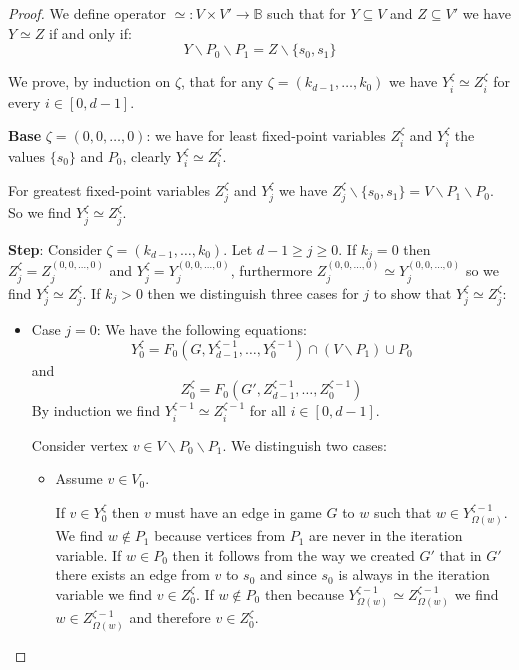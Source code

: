 \begin{theorem}
\begin{proof}
		
		We define operator $\simeq : V \times V' \rightarrow \mathbb{B}$ such that for $Y \subseteq V$ and $Z \subseteq V'$ we have $Y \simeq Z$ if and only if:
		\[ Y \backslash P_0 \backslash P_1 = Z \backslash \{s_0,s_1\}\]
		
		We prove, by induction on $\zeta$, that for any $\zeta = (k_{d-1},\dots,k_0)$ we have $Y_i^{\zeta} \simeq Z_i^{\zeta}$ for every $i \in [0,d-1]$.
	
		
		\textbf{Base} $\zeta = (0,0,\dots,0)$: we have for least fixed-point variables $Z_i^\zeta$ and $Y_i^{\zeta}$ the values $\{s_0\}$ and $P_0$, clearly $Y_i^\zeta \simeq Z_i^{\zeta}$. 
		
		For greatest fixed-point variables $Z_j^\zeta$ and $Y_j^{\zeta}$ we have $Z_j^\zeta \backslash \{s_0,s_1\} = V \backslash P_1 \backslash P_0$. So we find $Y_j^\zeta \simeq Z_j^{\zeta}$.
		
		\textbf{Step}: Consider $\zeta = (k_{d-1},\dots,k_0)$. Let $d-1 \geq j \geq 0$. If $k_j = 0$ then $Z_j^\zeta = Z_j^{(0,0,\dots,0)}$ and $Y_j^{\zeta} = Y_j^{(0,0,\dots,0)}$, furthermore $Z_j^{(0,0,\dots,0)}\simeq Y_j^{(0,0,\dots,0)}$ so we find $Y_j^{\zeta} \simeq Z_j^{\zeta}$.
		If $k_j > 0$ then we distinguish three cases for $j$ to show that $Y_j^{\zeta} \simeq Z_j^{\zeta}$:
		\begin{itemize}
			\item Case $j=0$: We have the following equations:
			\[ Y_0^{\zeta} = F_0(G,Y_{d-1}^{\zeta-1},\dots,Y_0^{\zeta-1}) \cap (V\backslash P_1) \cup P_0 \]
			and
			\[ Z_0^{\zeta} = F_0(G',Z_{d-1}^{\zeta-1},\dots,Z_0^{\zeta-1}) \]
			By induction we find $Y_i^{\zeta-1} \simeq Z_i^{\zeta-1}$ for all $i \in [0,d-1]$.
			
			
			Consider vertex $v \in V\backslash P_0 \backslash P_1$. We distinguish two cases:
			\begin{itemize}
				\item Assume $v \in V_0$.
				
				If $v \in Y_0^{\zeta}$ then $v$ must have an edge in game $G$ to $w$ such that $w\in Y^{\zeta-1}_{\Omega(w)}$. We find $w \notin P_1$ because vertices from $P_1$ are never in the iteration variable. If $w \in P_0$ then it follows from the way we created $G'$ that in $G'$ there exists an edge from $v$ to $s_0$ and since $s_0$ is always in the iteration variable we find $v \in Z_0^{\zeta}$. If $w \notin P_0$ then because $Y^{\zeta-1}_{\Omega(w)} \simeq Z^{\zeta-1}_{\Omega(w)}$ we find $w \in Z^{\zeta-1}_{\Omega(w)}$ and therefore $v \in Z_0^{\zeta}$.
				

\end{itemize}
\end{itemize}
\end{proof}
\end{theorem}
